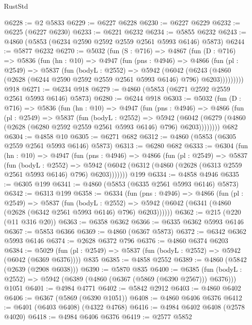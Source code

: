 \begin{lexlean}{RustStd}
\begin{coremodule}
@6228 := @2 @5833
@6229 := @6227 @6228
@6230 := @6227 @6229
@6232 := @6225 (@6227 @6230)
@6233 := @6221 @6232
@6234 := @5855 @6232
@6243 := @4860 (@5853 (@6234 @2590 @2592 @2559 @2561 @5993 @6146) @5873)
@6244 := @5877 @6232
@6270 := @5032
    (fun (S : @716) =>
    @4867
      (fun (D : @716) =>
      @5836
        (fun (hn : @10) =>
        @4947
          (fun (pns : @4946) =>
          @4866
            (fun (pl : @2549) =>
            @5837
              (fun (bodyL : @2552) =>
              @5942
                (@6042
                  (@6243
                    (@4860 (@2628 (@6244 @2590 @2592 @2559 @2561 @5993 @6146) @796) @6203)))))))))
    @918
@6271 := @6234 @918
@6279 := @4860 (@5853 (@6271 @2592 @2559 @2561 @5993 @6146) @5873)
@6280 := @6244 @918
@6303 := @5032
    (fun (D : @716) =>
    @5836
      (fun (hn : @10) =>
      @4947
        (fun (pns : @4946) =>
        @4866
          (fun (pl : @2549) =>
          @5837
            (fun (bodyL : @2552) =>
            @5942
              (@6042 (@6279 (@4860 (@2628 (@6280 @2592 @2559 @2561 @5993 @6146) @796) @6203))))))))
    @682
@6304 := @4858 @10
@6305 := @6271 @682
@6312 := @4860 (@5853 (@6305 @2559 @2561 @5993 @6146) @5873)
@6313 := @6280 @682
@6333 := @6304
    (fun (hn : @10) =>
    @4947
      (fun (pns : @4946) =>
      @4866
        (fun (pl : @2549) =>
        @5837
          (fun (bodyL : @2552) =>
          @5942 (@6042 (@6312 (@4860 (@2628 (@6313 @2559 @2561 @5993 @6146) @796) @6203)))))))
    @199
@6334 := @4858 @4946
@6335 := @6305 @199
@6341 := @4860 (@5853 (@6335 @2561 @5993 @6146) @5873)
@6342 := @6313 @199
@6358 := @6334
    (fun (pns : @4946) =>
    @4866
      (fun (pl : @2549) =>
      @5837
        (fun (bodyL : @2552) =>
        @5942 (@6042 (@6341 (@4860 (@2628 (@6342 @2561 @5993 @6146) @796) @6203))))))
@6362 := @215 (@220 (@11 @316 @20))
@6363 := @6358 @6362
@6366 := @6335 @6362 @5993 @6146
@6367 := @5853 @6366
@6369 := @4860 (@6367 @5873)
@6372 := @6342 @6362 @5993 @6146
@6374 := @2628 @6372 @796
@6376 := @4860 @6374 @6203
@6384 := @5029 (fun (pl : @2549) => @5837 (fun (bodyL : @2552) => @5942 (@6042 (@6369 @6376)))) @835
@6385 := @4858 @2552
@6389 := @4860 (@5842 (@2639 (@2908 @6038)))
@6390 := @5870 @835
@6400 := @6385
    (fun (bodyL : @2552) => @5942 (@6389 (@4860 (@6367 (@5869 (@6390 @2567))) @6376)))
    @1051
@6401 := @4984 @4771
@6402 := @5842 @2912
@6403 := @4860 @6402
@6406 := @6367 (@5869 (@6390 @1051))
@6408 := @4860 @6406 @6376
@6412 := @6401 (@6403 @6408) (@4322 @4768)
@6416 := @4984 @6402 @6408 (@2578 @4020)
@6418 := @4984 @6406 @6376
@6419 := @2577 @5852

\end{coremodule}
\end{lexlean}
